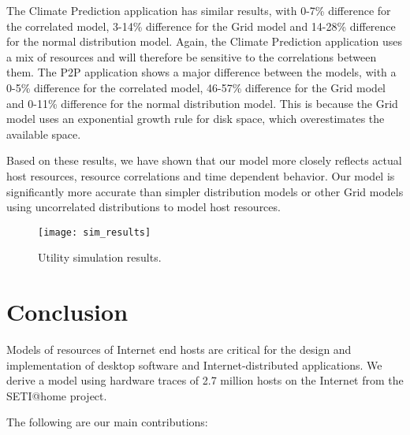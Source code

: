 \documentclass[conference]{IEEEtran}
\begin{document}
The Climate Prediction application has similar results, with 0-7\% difference for the correlated model, 3-14\% difference for the Grid model and 14-28\% difference for the normal distribution model.  Again, the Climate Prediction application uses a mix of resources and will therefore be sensitive to the correlations between them.  The P2P application shows a major difference between the models, with a 0-5\% difference for the correlated model, 46-57\% difference for the Grid model and 0-11\% difference for the normal distribution model.  This is because the Grid model uses an exponential growth rule for disk space, which overestimates the available space.

Based on these results, we have shown that our model more closely reflects actual host resources, resource correlations and time dependent behavior.  Our model is significantly more accurate than simpler distribution models or other Grid models using uncorrelated distributions to model host resources.

\begin{figure}[!t]
\centering
\texttt{[image: sim\_results]}
\caption{Utility simulation results.}
\label{fig-sim-results}
\end{figure}


\section{Conclusion}
\label{conc-sec}

Models of resources of Internet end hosts are critical for
the design and implementation of desktop software and
Internet-distributed applications.  We derive a model using
hardware traces of 2.7 million hosts on the Internet from
the SETI@home project. 

The following are our main contributions:
\end{document}
